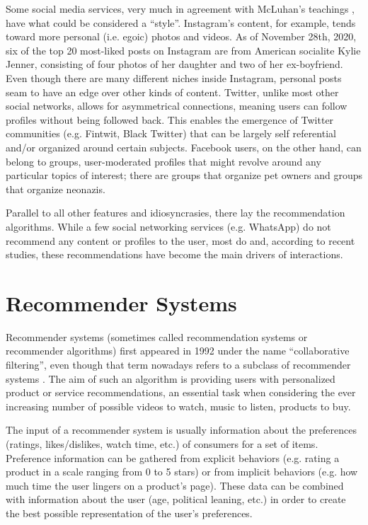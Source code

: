 Some social media services, very much in agreement with McLuhan's teachings
\citep{mcluhan1994understanding}, have what could be considered a ``style''.
Instagram's content, for example, tends toward more personal (i.e. egoic) photos
and videos. As of November 28th, 2020, six of the top 20 most-liked posts on
Instagram are from American socialite Kylie Jenner, consisting of four photos of
her daughter and two of her ex-boyfriend. Even though there are many different
niches inside Instagram, personal posts seam to have an edge over other kinds of
content.
Twitter, unlike most other social networks, allows for asymmetrical connections,
meaning users can follow profiles without being followed back. This enables the
emergence of Twitter communities (e.g. Fintwit, Black Twitter) that can be
largely self referential and/or organized around certain subjects. Facebook
users, on the other hand, can belong to groups, user-moderated profiles that
might revolve around any particular topics of interest; there are groups that
organize pet owners and groups that organize neonazis.

Parallel to all other features and idiosyncrasies, there lay the recommendation
algorithms. While a few social networking services (e.g. WhatsApp) do not
recommend any content or profiles to the user, most do and, according to recent
studies, these recommendations have become the main drivers of interactions.

\section{Recommender Systems}
\label{sec:recommender_systems}

Recommender systems (sometimes called recommendation systems or recommender
algorithms) first appeared in 1992 under the name ``collaborative filtering'',
even though that term nowadays refers to a subclass of recommender systems
\citep{goldberg_using_1992}. The aim of such an algorithm is providing users
with personalized product or service recommendations, an essential task when
considering the ever increasing number of possible videos to watch, music to
listen, products to buy.

The input of a recommender system is usually information about the preferences
(ratings, likes/dislikes, watch time, etc.) of consumers for a set of items.
Preference information can be gathered from explicit behaviors (e.g. rating a
product in a scale ranging from 0 to 5 stars) or from implicit behaviors (e.g.
how much time the user lingers on a product's page). These data can be combined
with information about the user (age, political leaning, etc.) in order to
create the best possible representation of the user's preferences.

